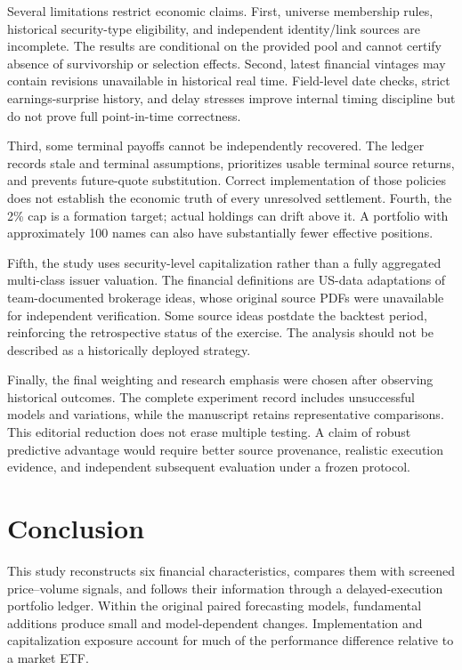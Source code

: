 \documentclass[11pt]{article}
\begin{document}
Several limitations restrict economic claims. First, universe membership rules, historical security-type eligibility, and independent identity/link sources are incomplete. The results are conditional on the provided pool and cannot certify absence of survivorship or selection effects. Second, latest financial vintages may contain revisions unavailable in historical real time. Field-level date checks, strict earnings-surprise history, and delay stresses improve internal timing discipline but do not prove full point-in-time correctness.

Third, some terminal payoffs cannot be independently recovered. The ledger records stale and terminal assumptions, prioritizes usable terminal source returns, and prevents future-quote substitution. Correct implementation of those policies does not establish the economic truth of every unresolved settlement. Fourth, the 2\% cap is a formation target; actual holdings can drift above it. A portfolio with approximately 100 names can also have substantially fewer effective positions.

Fifth, the study uses security-level capitalization rather than a fully aggregated multi-class issuer valuation. The financial definitions are US-data adaptations of team-documented brokerage ideas, whose original source PDFs were unavailable for independent verification. Some source ideas postdate the backtest period, reinforcing the retrospective status of the exercise. The analysis should not be described as a historically deployed strategy.

Finally, the final weighting and research emphasis were chosen after observing historical outcomes. The complete experiment record includes unsuccessful models and variations, while the manuscript retains representative comparisons. This editorial reduction does not erase multiple testing. A claim of robust predictive advantage would require better source provenance, realistic execution evidence, and independent subsequent evaluation under a frozen protocol.
\clearpage

\section{Conclusion}
This study reconstructs six financial characteristics, compares them with screened price--volume signals, and follows their information through a delayed-execution portfolio ledger. Within the original paired forecasting models, fundamental additions produce small and model-dependent changes. Implementation and capitalization exposure account for much of the performance difference relative to a market ETF.
\end{document}
